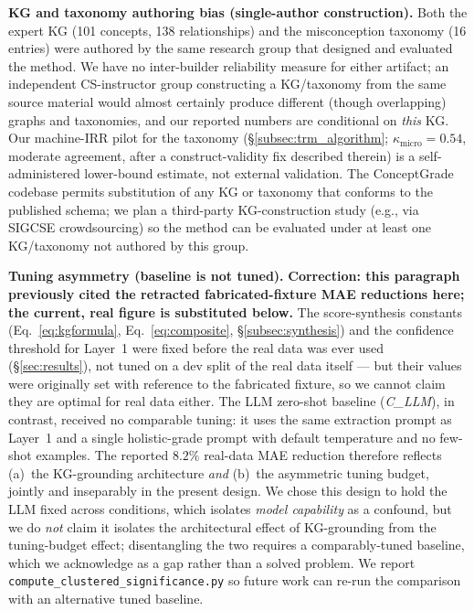 \documentclass[conference]{IEEEtran}
\begin{document}
\textbf{KG and taxonomy authoring bias (single-author construction).} Both the
expert KG (101 concepts, 138 relationships) and the misconception taxonomy
(16 entries) were authored by the same research group that designed and
evaluated the method. We have no inter-builder reliability measure for either
artifact; an independent CS-instructor group constructing a KG/taxonomy from
the same source material would almost certainly produce different (though
overlapping) graphs and taxonomies, and our reported numbers are conditional
on \emph{this} KG. Our machine-IRR pilot for the taxonomy (\S\ref{subsec:trm_algorithm};
$\kappa_{\text{micro}} = 0.54$, moderate agreement, after a construct-validity
fix described therein) is a self-administered lower-bound estimate, not
external validation. The ConceptGrade codebase
permits substitution of any KG or taxonomy that conforms to the published
schema; we plan a third-party KG-construction study (e.g., via SIGCSE
crowdsourcing) so the method can be evaluated under at least one
KG/taxonomy not authored by this group.

\textbf{Tuning asymmetry (baseline is not tuned).} \textbf{Correction:
this paragraph previously cited the retracted fabricated-fixture MAE
reductions here; the current, real figure is substituted below.} The
score-synthesis constants (Eq.~\eqref{eq:kgformula},
Eq.~\eqref{eq:composite}, \S\ref{subsec:synthesis}) and the confidence
threshold for Layer~1 were fixed before the real data was ever used
(\S\ref{sec:results}), not tuned on a dev split of the real data itself
--- but their values were originally set with reference to the
fabricated fixture, so we cannot claim they are optimal for real data
either. The LLM zero-shot baseline (\textit{C\_LLM}), in contrast, received no
comparable tuning: it uses the same
extraction prompt as Layer~1 and a single holistic-grade prompt with default
temperature and no few-shot examples. The reported $8.2\%$ real-data MAE
reduction therefore reflects (a)~the
KG-grounding architecture \emph{and} (b)~the asymmetric tuning budget,
jointly and inseparably in the present design. We chose this design to
hold the LLM fixed across conditions, which isolates \emph{model capability}
as a confound, but we do \emph{not} claim it isolates the architectural
effect of KG-grounding from the tuning-budget effect; disentangling the
two requires a comparably-tuned baseline, which we acknowledge as a gap
rather than a solved problem. We report
\texttt{compute\_clustered\_significance.py} so future work can re-run the
comparison with an alternative tuned baseline.
\end{document}
